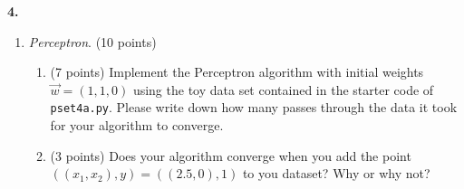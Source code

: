 \documentclass[12pt]{amsart}
\newenvironment{statement}[1]{\smallskip\noindent\color[rgb]{0.0,0.0,0.0} {\bf #1.}}{}
\newcommand{\1}{\mathds{1}}
\begin{document}
\begin{statement}{4}
\begin{enumerate}
    \item \emph{Perceptron}. (10 points)
    \begin{enumerate}
        \item (7 points) Implement the Perceptron algorithm with initial weights $\vec w = (1, 1, 0)$ using the toy data set contained in the starter code of \texttt{pset4a.py}. Please write down how many passes through the data it took for your algorithm to converge.
        \item (3 points) Does your algorithm converge when you add the point $((x_1, x_2), y) = ((2.5, 0), 1)$ to you dataset? Why or why not?
    \end{enumerate} 
    
\end{enumerate}
\end{statement}

\newpage
\end{document}
